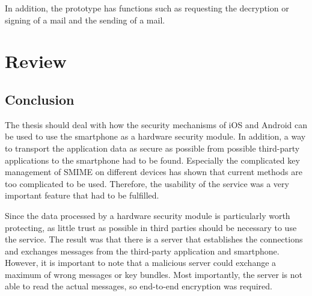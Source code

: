 \documentclass[12pt,oneside,a4paper,parskip]{scrbook}
\begin{document}
In addition, the prototype has functions such as requesting the decryption or signing of a mail and the sending of a mail.







\chapter{Review}
\section{Conclusion}
The thesis should deal with how the security mechanisms of iOS and Android can be used to use the smartphone as a hardware security module. In addition, a way to transport the application data as secure as possible from possible third-party applications to the smartphone had to be found. Especially the complicated key management of SMIME on different devices has shown that current methods are too complicated to be used. Therefore, the usability of the service was a very important feature that had to be fulfilled.

Since the data processed by a hardware security module is particularly worth protecting, as little trust as possible in third parties should be necessary to use the service. The result was that there is a server that establishes the connections and exchanges messages from the third-party application and smartphone. However, it is important to note that a malicious server could exchange a maximum of wrong messages or key bundles. Most importantly, the server is not able to read the actual messages, so end-to-end encryption was required. 
\end{document}

